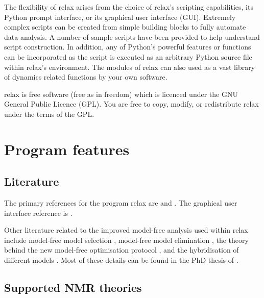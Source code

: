 The flexibility of relax arises from the choice of relax's scripting capabilities, its Python prompt interface, or its graphical user interface (GUI).  Extremely complex scripts can be created from simple building blocks to fully automate data analysis.  A number of sample scripts have been provided to help understand script construction. In addition, any of Python's powerful features or functions can be incorporated as the script is executed as an arbitrary Python source file within relax's environment.  The modules of relax can also used as a vast library of dynamics related functions by your own software.

relax is free software (free as in freedom) which is licenced under the GNU General Public Licence (GPL). You are free to copy, modify, or redistribute relax under the terms of the GPL. 



\section{Program features}



\subsection{Literature}

The primary references for the program relax are \citet{dAuvergneGooley08a} and \citet{dAuvergneGooley08b}.  The graphical user interface reference is \citet{Bieri11}.

Other literature related to the improved model-free analysis used within relax include model-free model selection \citep{dAuvergneGooley03, Chen04}, model-free model elimination \citep{dAuvergneGooley06}, the theory \citep{dAuvergneGooley07} behind the new model-free optimisation protocol \citep{dAuvergneGooley08b}, and the hybridisation of different models \citep{Horne07, dAuvergneGooley08b}. Most of these details can be found in the PhD thesis of \citet{dAuvergne06}.



\subsection{Supported NMR theories}

